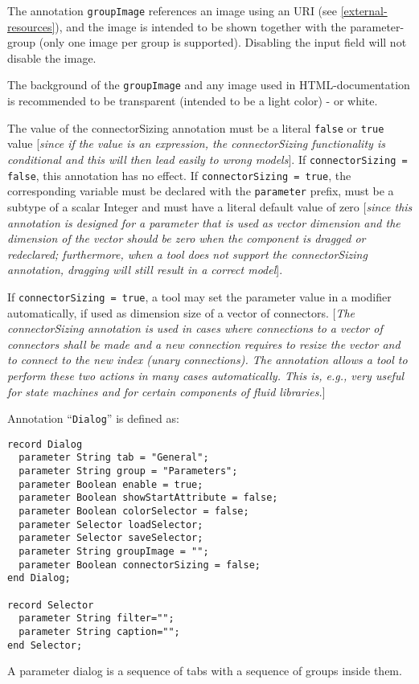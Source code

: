 The annotation \lstinline!groupImage! references an image using an URI (see
\autoref{external-resources}), and the image is intended to be shown together with the
parameter-group (only one image per group is supported). Disabling the
input field will not disable the image.

The background of the \lstinline!groupImage! and any image used in HTML-documentation is recommended to be transparent (intended to be a light color) - or white.

The value of the connectorSizing annotation must be a literal
\lstinline!false! or \lstinline!true! value {[}\emph{since if the value is an
expression, the connectorSizing functionality is conditional and this
will then lead easily to wrong models}{]}. If \lstinline!connectorSizing = false!, this annotation has no effect.
If \lstinline!connectorSizing = true!, the corresponding variable must be declared with the
\lstinline!parameter! prefix, must be a subtype of a scalar Integer and
must have a literal default value of zero {[}\emph{since this annotation
is designed for a parameter that is used as vector dimension and the
dimension of the vector should be zero when the component is dragged or
redeclared; furthermore, when a tool does not support the
connectorSizing annotation, dragging will still result in a correct
model}{]}.

If \lstinline!connectorSizing = true!, a tool may set the parameter value
in a modifier automatically, if used as dimension size of a vector of
connectors. {[}\emph{The connectorSizing annotation is used in cases
where connections to a vector of connectors shall be made and a new
connection requires to resize the vector and to connect to the new index
(unary connections). The annotation allows a tool to perform these two
actions in many cases automatically. This is, e.g., very useful for
state machines and for certain components of fluid libraries.}{]}

Annotation ``\lstinline!Dialog!'' is defined as:

\begin{lstlisting}[language=modelica]
record Dialog
  parameter String tab = "General";
  parameter String group = "Parameters";
  parameter Boolean enable = true;
  parameter Boolean showStartAttribute = false;
  parameter Boolean colorSelector = false;
  parameter Selector loadSelector;
  parameter Selector saveSelector;
  parameter String groupImage = "";
  parameter Boolean connectorSizing = false;
end Dialog;

record Selector
  parameter String filter="";
  parameter String caption="";
end Selector;
\end{lstlisting}
A parameter dialog is a sequence of tabs with a sequence of groups
inside them.

